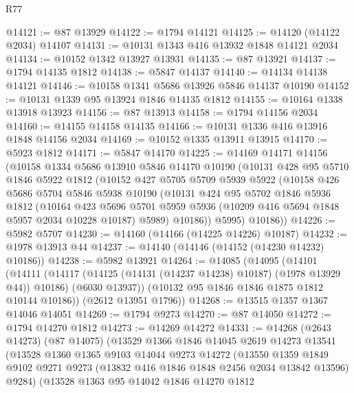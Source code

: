 \begin{lexlean}{R77}
\begin{coremodule}
@14121 := @87 @13929
@14122 := @1794 @14121
@14125 := @14120 (@14122 @2034) @14107
@14131 := @10131 @1343 @416 @13932 @1848 @14121 @2034
@14134 := @10152 @1342 @13927 @13931
@14135 := @87 @13921
@14137 := @1794 @14135 @1812
@14138 := @5847 @14137
@14140 := @14134 @14138 @14121
@14146 := @10158 @1341 @5686 @13926 @5846 @14137 @10190
@14152 := @10131 @1339 @95 @13924 @1846 @14135 @1812
@14155 := @10164 @1338 @13918 @13923
@14156 := @87 @13913
@14158 := @1794 @14156 @2034
@14160 := @14155 @14158 @14135
@14166 := @10131 @1336 @416 @13916 @1848 @14156 @2034
@14169 := @10152 @1335 @13911 @13915
@14170 := @5923 @1812
@14171 := @5847 @14170
@14225 := @14169
    @14171
    @14156
    (@10158
      @1334
      @5686
      @13910
      @5846
      @14170
      @10190
      (@10131
        @428
        @95
        @5710
        @1846
        @5922
        @1812
        (@10152
          @427
          @5705
          @5709
          @5939
          @5922
          (@10158
            @426
            @5686
            @5704
            @5846
            @5938
            @10190
            (@10131
              @424
              @95
              @5702
              @1846
              @5936
              @1812
              (@10164
                @423
                @5696
                @5701
                @5959
                @5936
                (@10209 @416 @5694 @1848 @5957 @2034 @10228 @10187)
                @5989)
              @10186))
          @5995)
        @10186))
@14226 := @5982 @5707
@14230 := @14160 (@14166 (@14225 @14226) @10187)
@14232 := @1978 @13913 @44
@14237 := @14140 (@14146 (@14152 (@14230 @14232) @10186))
@14238 := @5982 @13921
@14264 := @14085
    (@14095
      (@14101
        (@14111
          (@14117 (@14125 (@14131 (@14237 @14238) @10187) (@1978 @13929 @44)) @10186)
          (@6030 @13937))
        (@10132 @95 @1846 @1846 @1875 @1812 @10144 @10186))
      (@2612 @13951 @1796))
@14268 := @13515 @1357 @1367 @14046 @14051
@14269 := @1794 @9273
@14270 := @87 @14050
@14272 := @1794 @14270 @1812
@14273 := @14269 @14272
@14331 := @14268
    (@2643 @14273)
    (@87 @14075)
    (@13529
      @1366
      @1846
      @14045
      @2619
      @14273
      @13541
      (@13528
        @1360
        @1365
        @9103
        @14044
        @9273
        @14272
        (@13550
          @1359
          @1849
          @9102
          @9271
          @9273
          (@13832 @416 @1846 @1848 @2456 @2034 @13842 @13596)
          @9284)
        (@13528
          @1363
          @95
          @14042
          @1846
          @14270
          @1812

\end{coremodule}
\end{lexlean}
